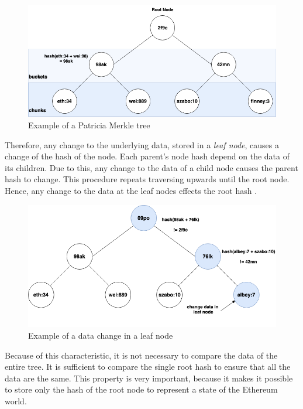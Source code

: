\begin{figure}[htbp]
	\centering
	\includegraphics[width=.9\linewidth]{./figures/merkle_tree.png}
	\caption{Example of a Patricia Merkle tree}
	\label{figure:merkle_tree}
\end{figure}

Therefore, any change to the underlying data, stored in a \textit{leaf node}, causes a change of the hash of the node. Each parent's node hash depend on the data of its children. Due to this, any change to the data of a child node causes the parent hash to change. This procedure repeats traversing upwards until the root node. Hence, any change to the data at the leaf nodes effects the root hash . 

\begin{figure}[htbp]
	\centering
	\includegraphics[width=.9\linewidth]{./figures/merkle_tree_change.png}
	\caption{Example of a data change in a leaf node}
	\label{figure:merkle_tree_change}
\end{figure}

Because of this characteristic, it is not necessary to compare the data of the entire tree. It is sufficient to compare the single root hash to ensure that all the data are the same. This property is very important, because it makes it possible to store only the hash of the root node to represent a state of the Ethereum world. 

